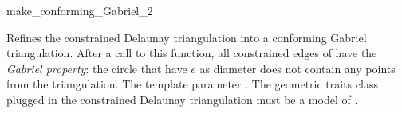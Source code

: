 \begin{ccRefFunction}{make_conforming_Gabriel_2}


{ Refines the constrained Delaunay triangulation  into a
  conforming Gabriel triangulation. After a call to this function, all
  constrained edges of  have the \emph{Gabriel property}: the
  circle that have $e$ as diameter does not contain any points from
  the triangulation.  
  \ccPrecond The template parameter 
    \meshcdtrequires{}. The geometric traits class plugged in the
    constrained Delaunay triangulation must be a model of
    .} 

\end{ccRefFunction}


